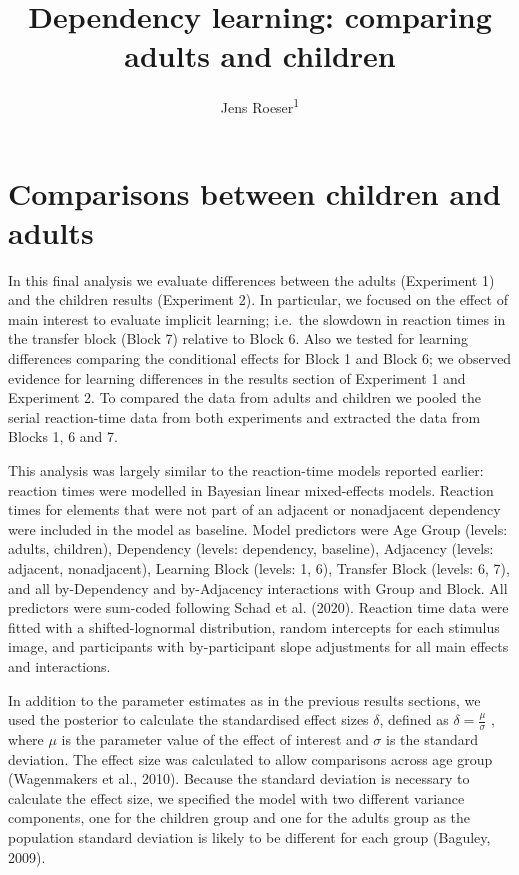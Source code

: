 \documentclass[
  english,
  man,floatsintext]{apa7}
\author{Jens Roeser\textsuperscript{1}}
\affiliation{
\vspace{0.5cm}
\textsuperscript{1} Department of Psychology, Nottingham Trent University, United Kingdom}
\title{Dependency learning: comparing adults and children}
\date{}
\begin{document}
\maketitle

\hypertarget{comparisons-between-children-and-adults}{%
\section{Comparisons between children and adults}\label{comparisons-between-children-and-adults}}

In this final analysis we evaluate differences between the adults (Experiment 1) and the children results (Experiment 2). In particular, we focused on the effect of main interest to evaluate implicit learning; i.e.~the slowdown in reaction times in the transfer block (Block 7) relative to Block 6. Also we tested for learning differences comparing the conditional effects for Block 1 and Block 6; we observed evidence for learning differences in the results section of Experiment 1 and Experiment 2. To compared the data from adults and children we pooled the serial reaction-time data from both experiments and extracted the data from Blocks 1, 6 and 7.

This analysis was largely similar to the reaction-time models reported earlier: reaction times were modelled in Bayesian linear mixed-effects models. Reaction times for elements that were not part of an adjacent or nonadjacent dependency were included in the model as baseline. Model predictors were Age Group (levels: adults, children), Dependency (levels: dependency, baseline), Adjacency (levels: adjacent, nonadjacent), Learning Block (levels: 1, 6), Transfer Block (levels: 6, 7), and all by-Dependency and by-Adjacency interactions with Group and Block. All predictors were sum-coded following Schad et al. (2020). Reaction time data were ﬁtted with a shifted-lognormal distribution, random intercepts for each stimulus image, and participants with by-participant slope adjustments for all main effects and interactions.

In addition to the parameter estimates as in the previous results sections, we used the posterior to calculate the standardised effect sizes \(\delta\), defined as \(\delta = \frac{\mu}{\sigma}\) , where \(\mu\) is the parameter value of the effect of interest and \(\sigma\) is the standard deviation. The effect size was calculated to allow comparisons across age group (Wagenmakers et al., 2010). Because the standard deviation is necessary to calculate the effect size, we specified the model with two different variance components, one for the children group and one for the adults group as the population standard deviation is likely to be different for each group (Baguley, 2009).
\end{document}

